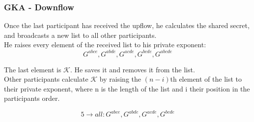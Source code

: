 \begin{frame}
  \frametitle{GKA - Downflow}
  Once the last participant has received the upflow, he calculates the shared secret, and broadcasts a new list to all other participants.\\[0.3cm]

  He raises every element of the  received list to his private exponent:
  \[ G^{abce}, G^{abde}, G^{acde}, G^{bcde}, G^{abcde} \]

  The last element is $\mathcal{K}$. He saves it and removes it from the list.\\[0.3cm]

  Other participants calculate $\mathcal{K}$ by raising the $(n-i)$th element of the list to their private exponent, where n is the length of the list and i their position in the participants order.

  \begin{minipage}{.47\textwidth}
    \[ 5 \rightarrow all: G^{abce}, G^{abde}, G^{acde}, G^{bcde} \]

  \end{minipage}
  \begin{minipage}{.47\textwidth}
  \begin{figure}
    \end{figure}
  \end{minipage}
\end{frame}
